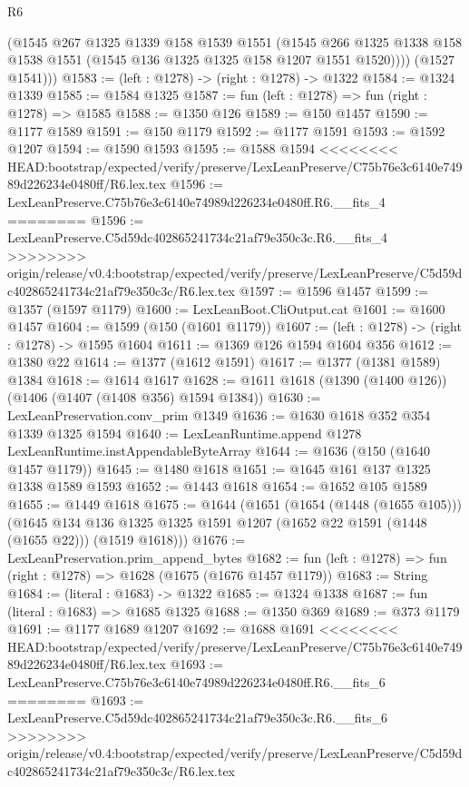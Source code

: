 \begin{lexlean}{R6}
\begin{coremodule}
{{{{{{{{{{{{{{{{{{{{{{{{{{{{{{{{{{{{{{{{{{{{{{{{{{          (@1545
            @267
            @1325
            @1339
            @158
            @1539
            @1551
            (@1545
              @266
              @1325
              @1338
              @158
              @1538
              @1551
              (@1545 @136 @1325 @1325 @158 @1207 @1551 @1520))))
        (@1527 @1541)))
@1583 := (left : @1278) -> (right : @1278) -> @1322
@1584 := @1324 @1339
@1585 := @1584 @1325
@1587 := fun (left : @1278) => fun (right : @1278) => @1585
@1588 := @1350 @126
@1589 := @150 @1457
@1590 := @1177 @1589
@1591 := @150 @1179
@1592 := @1177 @1591
@1593 := @1592 @1207
@1594 := @1590 @1593
@1595 := @1588 @1594
<<<<<<<< HEAD:bootstrap/expected/verify/preserve/LexLeanPreserve/C75b76e3c6140e74989d226234e0480ff/R6.lex.tex
@1596 := LexLeanPreserve.C75b76e3c6140e74989d226234e0480ff.R6.__fits_4
========
@1596 := LexLeanPreserve.C5d59dc402865241734c21af79e350c3c.R6.__fits_4
>>>>>>>> origin/release/v0.4:bootstrap/expected/verify/preserve/LexLeanPreserve/C5d59dc402865241734c21af79e350c3c/R6.lex.tex
@1597 := @1596 @1457
@1599 := @1357 (@1597 @1179)
@1600 := LexLeanBoot.CliOutput.cat
@1601 := @1600 @1457
@1604 := @1599 (@150 (@1601 @1179))
@1607 := (left : @1278) -> (right : @1278) -> @1595 @1604
@1611 := @1369 @126 @1594 @1604 @356
@1612 := @1380 @22
@1614 := @1377 (@1612 @1591)
@1617 := @1377 (@1381 @1589) @1384
@1618 := @1614 @1617
@1628 := @1611 @1618 (@1390 (@1400 @126)) (@1406 (@1407 (@1408 @356) @1594 @1384))
@1630 := LexLeanPreservation.conv_prim @1349
@1636 := @1630 @1618 @352 @354 @1339 @1325 @1594
@1640 := LexLeanRuntime.append @1278 LexLeanRuntime.instAppendableByteArray
@1644 := @1636 (@150 (@1640 @1457 @1179))
@1645 := @1480 @1618
@1651 := @1645 @161 @137 @1325 @1338 @1589 @1593
@1652 := @1443 @1618
@1654 := @1652 @105 @1589
@1655 := @1449 @1618
@1675 := @1644
    (@1651
      (@1654 (@1448 (@1655 @105)))
      (@1645 @134 @136 @1325 @1325 @1591 @1207 (@1652 @22 @1591 (@1448 (@1655 @22))) (@1519 @1618)))
@1676 := LexLeanPreservation.prim_append_bytes
@1682 := fun (left : @1278) => fun (right : @1278) => @1628 (@1675 (@1676 @1457 @1179))
@1683 := String
@1684 := (literal : @1683) -> @1322
@1685 := @1324 @1338
@1687 := fun (literal : @1683) => @1685 @1325
@1688 := @1350 @369
@1689 := @373 @1179
@1691 := @1177 @1689 @1207
@1692 := @1688 @1691
<<<<<<<< HEAD:bootstrap/expected/verify/preserve/LexLeanPreserve/C75b76e3c6140e74989d226234e0480ff/R6.lex.tex
@1693 := LexLeanPreserve.C75b76e3c6140e74989d226234e0480ff.R6.__fits_6
========
@1693 := LexLeanPreserve.C5d59dc402865241734c21af79e350c3c.R6.__fits_6
>>>>>>>> origin/release/v0.4:bootstrap/expected/verify/preserve/LexLeanPreserve/C5d59dc402865241734c21af79e350c3c/R6.lex.tex
}}}}}}}}}}}}}}}}}}}}}}}}}}}}}}}}}}}}}}}}}}}}}}}}}}
\end{coremodule}
\end{lexlean}
